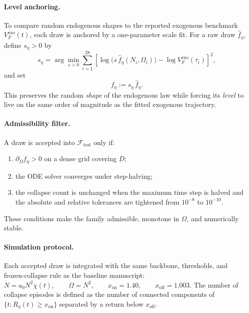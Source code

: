 \documentclass[11pt]{article}
\begin{document}
\paragraph{Level anchoring.}
To compare random endogenous shapes to the reported exogenous benchmark
\(V_F^{\mathrm{exo}}(t)\), each draw is anchored by a one-parameter scale fit. For a raw draw
\(\widehat f_\eta\), define \(s_\eta>0\) by
\begin{equation}
s_\eta=
\arg\min_{s>0}
\sum_{i=1}^{28}
\left[
\log\!\bigl(s\,\widehat f_\eta(N_i,\Omega_i)\bigr)-
\log V_F^{\mathrm{exo}}(\tau_i)
\right]^2,
\label{eq:S1_scalefit}
\end{equation}
and set
\begin{equation}
f_\eta:=s_\eta\,\widehat f_\eta.
\label{eq:S1_scaledfamily}
\end{equation}
This preserves the random \emph{shape} of the endogenous law while forcing its \emph{level} to live
on the same order of magnitude as the fitted exogenous trajectory.

\paragraph{Admissibility filter.}
A draw is accepted into \(\mathcal F_{\mathrm{test}}\) only if:
\begin{enumerate}[label=(\alph*)]
\item \(\partial_\Omega f_\eta>0\) on a dense grid covering \(D\);
\item the ODE solver converges under step-halving;
\item the collapse count is unchanged when the maximum time step is halved and the absolute and
relative tolerances are tightened from \(10^{-8}\) to \(10^{-10}\).
\end{enumerate}
These conditions make the family admissible, monotone in \(\Omega\), and numerically stable.

\paragraph{Simulation protocol.}
Each accepted draw is integrated with the same backbone, thresholds, and frozen-collapse rule as the
baseline manuscript:
$\dot N=a_0N^2\chi(t),
\qquad
\dot\Omega=N^2,
\qquad
x_{\mathrm{on}}=1.40,
\qquad
x_{\mathrm{off}}=1.003.$
The number of collapse episodes is defined as the number of connected components of
\(\{t:R_\eta(t)\ge x_{\mathrm{on}}\}\) separated by a return below \(x_{\mathrm{off}}\).
\end{document}
